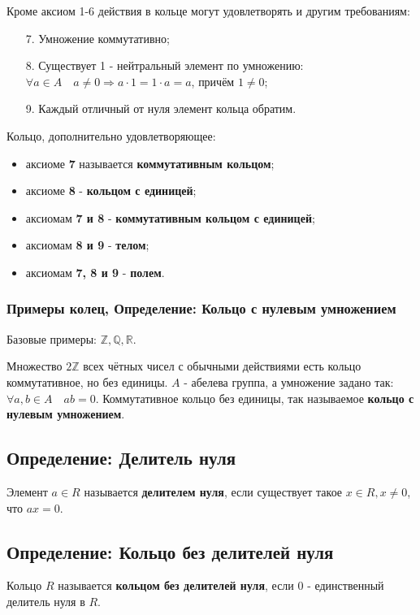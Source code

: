 \documentclass{article}
\begin{document}
Кроме аксиом 1-6 действия в кольце могут удовлетворять и другим требованиям:
\begin{enumerate}
\item[7.] Умножение коммутативно;
\item[8.] Существует 1 - нейтральный элемент по умножению: $\forall a \in A \quad a \neq 0 \Rightarrow a \cdot 1 = 1 \cdot a = a$, причём $1 \neq 0$;
\item[9.] Каждый отличный от нуля элемент кольца обратим.
\end{enumerate}

Кольцо, дополнительно удовлетворяющее:
\begin{itemize}
\item аксиоме \textbf{7} называется \textbf{коммутативным кольцом};
\item аксиоме \textbf{8} - \textbf{кольцом с единицей};
\item аксиомам \textbf{7 и 8} - \textbf{коммутативным кольцом с единицей};
\item аксиомам \textbf{8 и 9} - \textbf{телом};
\item аксиомам \textbf{7, 8 и 9} - \textbf{полем}.
\end{itemize}

\subsubsection{Примеры колец, Определение: Кольцо с нулевым умножением}
Базовые примеры: $\mathbb{Z}, \mathbb{Q}, \mathbb{R}$.

Множество $2\mathbb{Z}$ всех чётных чисел с обычными действиями есть кольцо коммутативное, но без единицы. $A$ - абелева группа, а умножение задано так: $\forall a, b \in A \quad ab = 0$. Коммутативное кольцо без единицы, так называемое \textbf{кольцо с нулевым умножением}.

\subsection{Определение: Делитель нуля}
Элемент $a \in R$ называется \textbf{делителем нуля}, если существует такое $x \in R, x \neq 0$, что $ax = 0$.

\subsection{Определение: Кольцо без делителей нуля}
Кольцо $R$ называется \textbf{кольцом без делителей нуля}, если 0 - единственный делитель нуля в $R$.
\end{document}
